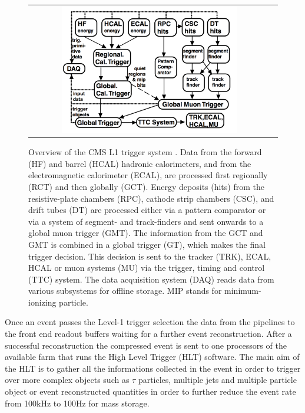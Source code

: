 \begin{figure}[tbh!]
	\centering
	\begin{tabular}{cc}
		\includegraphics[width=0.75\textwidth]{detector/pics/trigger_lvl1.pdf}
	\end{tabular}
	\caption{Overview of the CMS L1 trigger system \cite{Khachatryan:2016bia}. Data from the forward (HF) and barrel (HCAL) hadronic calorimeters, and from the electromagnetic calorimeter (ECAL), are processed first regionally (RCT) and then globally (GCT). Energy deposits (hits) from the resistive-plate chambers (RPC), cathode strip chambers (CSC), and drift tubes (DT) are processed either via a pattern comparator or via a system of segment- and track-finders and sent onwards to a global muon trigger (GMT). The information from the GCT and GMT is combined in a global trigger (GT), which makes the final trigger decision. This decision is sent to the tracker (TRK), ECAL, HCAL or muon systems (MU) via the trigger, timing and control (TTC) system. The data acquisition system (DAQ) reads data from various subsystems for offline storage. MIP stands for minimum-ionizing particle.}
	\label{fig:CMS_trigger}
\end{figure}

Once an event passes the Level-1 trigger selection the data from the pipelines to the front end readout buffers waiting for a further event reconstruction. After a successful reconstruction the compressed event is sent to one processors of the available farm that runs the High Level Trigger (HLT) software. The main aim of the HLT is to gather all the informations collected in the event in order to trigger over more complex objects such as $\tau$ particles, multiple jets and multiple particle object or event reconstructed quantities in order to further reduce the event rate from 100kHz to 100Hz for mass storage.

